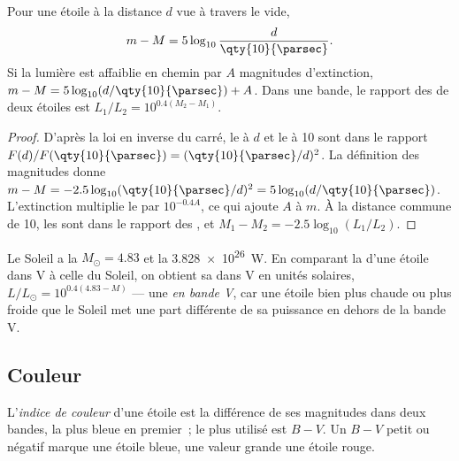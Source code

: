 \begin{proposition}\label{prop:b1:observing-the-sky:modulus}
Pour une étoile à la distance $d$ vue à travers le vide,
\[
  m - M = 5\log_{10}\frac{d}{\qty{10}{\parsec}} .
\]
Si la lumière est affaiblie en chemin par $A$ magnitudes d'extinction,
$m - M = 5\log_{10}(d/\qty{10}{\parsec}) + A$. Dans une bande, le rapport des
 de deux étoiles est $L_1/L_2 = 10^{0.4(M_2 - M_1)}$.
\end{proposition}

\begin{proof}
D'après la loi en inverse du carré, le  à $d$ et le  à \qty{10}{\parsec}
sont dans le rapport $F(d)/F(\qty{10}{\parsec}) = (\qty{10}{\parsec}/d)^2$. La
définition des magnitudes donne $m - M = -2.5\log_{10}(\qty{10}{\parsec}/d)^2
= 5\log_{10}(d/\qty{10}{\parsec})$. L'extinction multiplie le  par
$10^{-0.4A}$, ce qui ajoute $A$ à $m$. À la distance commune de
\qty{10}{\parsec}, les  sont dans le rapport des , et
$M_1 - M_2 = -2.5\log_{10}(L_1/L_2)$.
\end{proof}

Le Soleil a la  $M_\odot = 4.83$ et la 
\qty{3.828e26}{W}. En comparant la  d'une étoile dans V à celle
du Soleil, on obtient sa  dans V en unités solaires,
$L/L_\odot = 10^{0.4(4.83 - M)}$ --- une  \emph{en bande V}, car une
étoile bien plus chaude ou plus froide que le Soleil met une part différente de
sa puissance en dehors de la bande V.

\subsection*{Couleur}

\begin{definition}\label{def:b1:observing-the-sky:colour-index}
L'\emph{indice de couleur} d'une étoile est la différence de
ses magnitudes dans deux bandes, la plus bleue en premier~; le plus utilisé est
$B - V$. Un $B - V$ petit ou négatif marque une étoile bleue, une valeur
grande une étoile rouge.
\end{definition}

